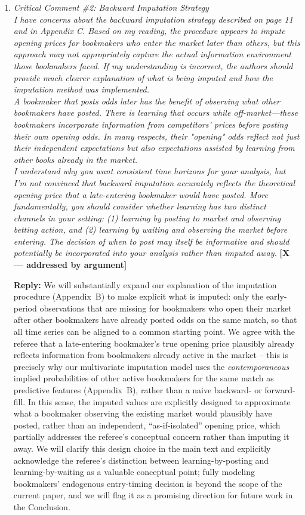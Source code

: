 \documentclass[letterpaper,12pt]{article}
\newcounter{b}
\newcommand{\argX}{\textcolor{green!55!black}{\textbf{[X --- addressed by argument]}}}
\newcommand{\Reply}[1]{\par\noindent\textbf{Reply:} #1}
\begin{document}
\begin{enumerate}
\item \textit{Critical Comment \#2: Backward Imputation Strategy\\[6pt]
I have concerns about the backward imputation strategy described on page 11 and in Appendix C. Based on my reading, the procedure appears to impute opening prices for bookmakers who enter the market later than others, but this approach may not appropriately capture the actual information environment those bookmakers faced. If my understanding is incorrect, the authors should provide much clearer explanation of what is being imputed and how the imputation method was implemented.\\[6pt]
A bookmaker that posts odds later has the benefit of observing what other bookmakers have posted. There is learning that occurs while off-market—these bookmakers incorporate information from competitors' prices before posting their own opening odds. In many respects, their "opening" odds reflect not just their independent expectations but also expectations assisted by learning from other books already in the market.\\[6pt]
I understand why you want consistent time horizons for your analysis, but I'm not convinced that backward imputation accurately reflects the theoretical opening price that a late-entering bookmaker would have posted. More fundamentally, you should consider whether learning has two distinct channels in your setting: (1) learning by posting to market and observing betting action, and (2) learning by waiting and observing the market before entering. The decision of when to post may itself be informative and should potentially be incorporated into your analysis rather than imputed away.} \argX

\Reply{We will substantially expand our explanation of the imputation procedure (Appendix~B) to make explicit what is imputed: only the early-period observations that are missing for bookmakers who open their market after other bookmakers have already posted odds on the same match, so that all time series can be aligned to a common starting point. We agree with the referee that a late-entering bookmaker's true opening price plausibly already reflects information from bookmakers already active in the market -- this is precisely why our multivariate imputation model uses the \emph{contemporaneous} implied probabilities of other active bookmakers for the same match as predictive features (Appendix~B), rather than a naive backward- or forward-fill. In this sense, the imputed values are explicitly designed to approximate what a bookmaker observing the existing market would plausibly have posted, rather than an independent, ``as-if-isolated'' opening price, which partially addresses the referee's conceptual concern rather than imputing it away. We will clarify this design choice in the main text and explicitly acknowledge the referee's distinction between learning-by-posting and learning-by-waiting as a valuable conceptual point; fully modeling bookmakers' endogenous entry-timing decision is beyond the scope of the current paper, and we will flag it as a promising direction for future work in the Conclusion.}


\end{enumerate}
\end{document}
